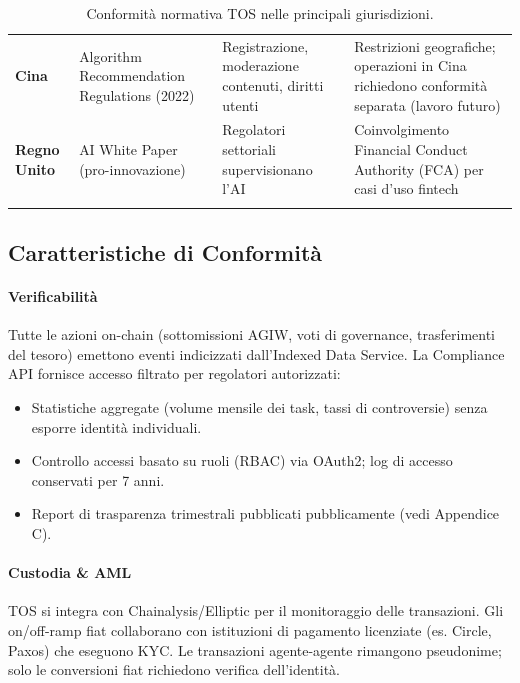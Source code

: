 \documentclass[11pt]{article}
\begin{document}
\begin{itemize}[noitemsep]
\begin{longtable}{@{}p{}p{}p{}p{}@{}}
\textbf{Cina} & Algorithm Recommendation Regulations (2022) & Registrazione, moderazione contenuti, diritti utenti & Restrizioni geografiche; operazioni in Cina richiedono conformità separata (lavoro futuro) \\
\textbf{Regno Unito} & AI White Paper (pro-innovazione) & Regolatori settoriali supervisionano l'AI & Coinvolgimento Financial Conduct Authority (FCA) per casi d'uso fintech \\
\bottomrule
\caption{Conformità normativa TOS nelle principali giurisdizioni.}
\end{longtable}

\subsection{Caratteristiche di Conformità}

\paragraph{Verificabilità}
Tutte le azioni on-chain (sottomissioni AGIW, voti di governance, trasferimenti del tesoro) emettono eventi indicizzati dall'Indexed Data Service. La Compliance API fornisce accesso filtrato per regolatori autorizzati:
\begin{itemize}[noitemsep]
  \item Statistiche aggregate (volume mensile dei task, tassi di controversie) senza esporre identità individuali.
  \item Controllo accessi basato su ruoli (RBAC) via OAuth2; log di accesso conservati per 7 anni.
  \item Report di trasparenza trimestrali pubblicati pubblicamente (vedi Appendice C).
\end{itemize}

\paragraph{Custodia \& AML}
TOS si integra con Chainalysis/Elliptic per il monitoraggio delle transazioni. Gli on/off-ramp fiat collaborano con istituzioni di pagamento licenziate (es. Circle, Paxos) che eseguono KYC. Le transazioni agente-agente rimangono pseudonime; solo le conversioni fiat richiedono verifica dell'identità.


\end{itemize}
\end{document}
